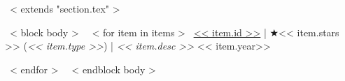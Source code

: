 ~< extends "section.tex" >~

~< block body >~
  ~< for item in items >~
    \href{<< item.repo_url >>}{<< item.id >>} | $\bigstar$<< item.stars >> (\textit{<< item.type >>}) |
    \emph{<< item.desc >>} \hfill
    << item.year>> \par
  ~< endfor >~
~< endblock body >~
